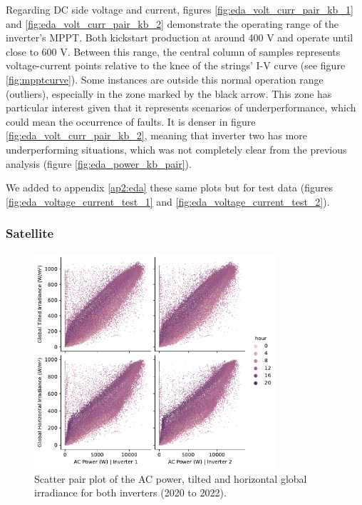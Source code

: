Regarding DC side voltage and current, figures \ref{fig:eda_volt_curr_pair_kb_1} and \ref{fig:eda_volt_curr_pair_kb_2} demonstrate the operating range of the inverter's MPPT. Both kickstart production at around 400 V and operate until close to 600 V. Between this range, the central column of samples represents voltage-current points relative to the knee of the strings' I-V curve (see figure \ref{fig:mpptcurve}). Some instances are outside this normal operation range (outliers), especially in the zone marked by the black arrow. This zone has particular interest given that it represents scenarios of underperformance, which could mean the occurrence of faults. It is denser in figure \ref{fig:eda_volt_curr_pair_kb_2}, meaning that inverter two has more underperforming situations, which was not completely clear from the previous analysis (figure \ref{fig:eda_power_kb_pair}).

We added to appendix \ref{ap2:eda} these same plots but for test data (figures \ref{fig:eda_voltage_current_test_1} and \ref{fig:eda_voltage_current_test_2}).

\subsubsection{Satellite}

\begin{figure}[h!]
    \centering
    \includegraphics[width=0.8\textwidth]{figures/chapter5/analysis/08_power_irrad_pairplot_scatter_kb.pdf}
    \caption{Scatter pair plot of the AC power, tilted and horizontal global irradiance for both inverters (2020 to 2022).}
    \label{fig:eda_power_irrad_pair_kb}
\end{figure}

